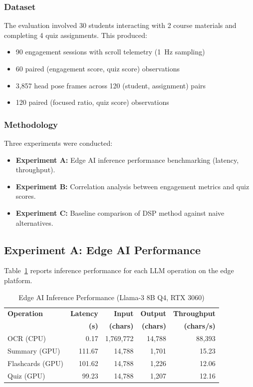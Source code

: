 \documentclass[conference]{IEEEtran}
\begin{document}
\subsubsection{Dataset}
The evaluation involved 30 students interacting with 2 course materials and completing 4 quiz assignments. This produced:
\begin{itemize}
    \item 90 engagement sessions with scroll telemetry (1~Hz sampling)
    \item 60 paired (engagement score, quiz score) observations
    \item 3,857 head pose frames across 120 (student, assignment) pairs
    \item 120 paired (focused ratio, quiz score) observations
\end{itemize}

\subsubsection{Methodology}
Three experiments were conducted:
\begin{itemize}
    \item \textbf{Experiment A:} Edge AI inference performance benchmarking (latency, throughput).
    \item \textbf{Experiment B:} Correlation analysis between engagement metrics and quiz scores.
    \item \textbf{Experiment C:} Baseline comparison of DSP method against naive alternatives.
\end{itemize}

\subsection{Experiment A: Edge AI Performance}

Table~\ref{tab:inference} reports inference performance for each LLM operation on the edge platform.

\begin{table}[htbp]
\caption{Edge AI Inference Performance (Llama-3 8B Q4, RTX 3060)}
\label{tab:inference}
\centering
\begin{tabular}{lrrrr}
\toprule
\textbf{Operation} & \textbf{Latency} & \textbf{Input} & \textbf{Output} & \textbf{Throughput} \\
 & \textbf{(s)} & \textbf{(chars)} & \textbf{(chars)} & \textbf{(chars/s)} \\
\midrule
OCR (CPU)      & 0.17    & 1,769,772 & 14,788 & 88,393 \\
Summary (GPU)  & 111.67  & 14,788    & 1,701  & 15.23  \\
Flashcards (GPU) & 101.62 & 14,788   & 1,226  & 12.06  \\
Quiz (GPU)     & 99.23   & 14,788    & 1,207  & 12.16  \\
\bottomrule
\end{tabular}
\end{table}
\end{document}
